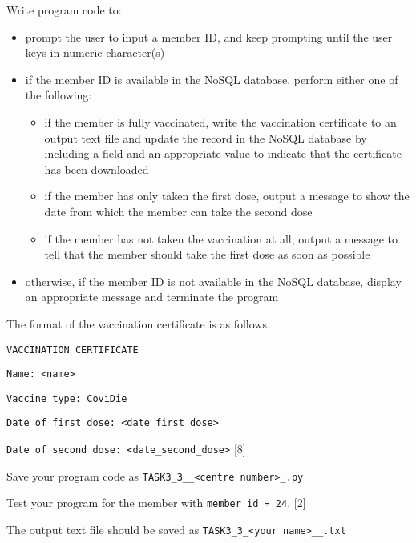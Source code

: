 \noindent Write program code to: 
\begin{itemize}
\item prompt the user to input a member ID, and keep prompting until the
user keys in numeric character(s) 
\item if the member ID is available in the NoSQL database, perform either
one of the following: 
\begin{itemize}
\item if the member is fully vaccinated, write the vaccination certificate
to an output text file and update the record in the NoSQL database
by including a field and an appropriate value to indicate that the
certificate has been downloaded 
\item if the member has only taken the first dose, output a message to show
the date from which the member can take the second dose 
\item if the member has not taken the vaccination at all, output a message
to tell that the member should take the first dose as soon as possible 
\end{itemize}
\item otherwise, if the member ID is not available in the NoSQL database,
display an appropriate message and terminate the program
\end{itemize}
\noindent The format of the vaccination certificate is as follows.

\noindent \texttt{VACCINATION CERTIFICATE}

\noindent \texttt{Name: <name> }

\noindent \texttt{Vaccine type: CoviDie }

\noindent \texttt{Date of first dose: <date\_first\_dose> }

\noindent \texttt{Date of second dose: <date\_second\_dose>} \hfill{}{[}8{]}

\noindent Save your program code as \texttt{TASK3\_3\_<your name>\_<centre
number>\_<index number>.py}

\noindent Test your program for the member with \texttt{member\_id
= 24}. \hfill{}{[}2{]}

\noindent The output text file should be saved as \texttt{TASK3\_3\_<your
name>\_<centre number>\_<index number>.txt}